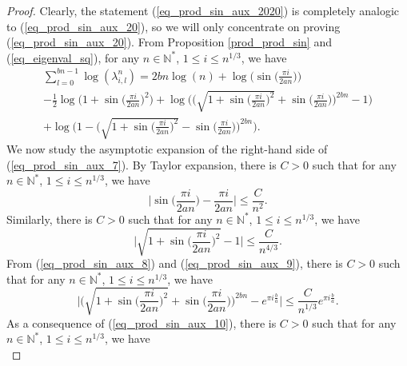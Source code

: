 \documentclass[12pt]{article}
\numberwithin{equation}{section}
\theoremstyle{theorem}
\theoremstyle{definition}
\theoremstyle{remark}
\newcommand{\nat}{\mathbb{N}}
\begin{document}
		\begin{proof}
			Clearly, the statement (\ref{eq_prod_sin_aux_2020}) is completely analogic to (\ref{eq_prod_sin_aux_20}), so we will only concentrate on proving (\ref{eq_prod_sin_aux_20}).
			From Proposition \ref{prod_prod_sin} and (\ref{eq_eigenval_sq}), for any $n \in \nat^*$, $1 \leq i \leq  n^{1/3}$,  we have
			\begin{multline}\label{eq_prod_sin_aux_7}
				\sum_{l = 0}^{bn - 1} 
				\log(\lambda_{i, l}^{n})
				=
				2 bn \log(n) 
				+
				\log \Big( \sin  \big( \frac{\pi i}{2 a n} \big) \Big) 
				\\
				- 
				\frac{1}{2} 
				\log \Big(
					1 + \sin  \big( \frac{\pi i}{2 a n} \big)^2
				\Big)
				+
				\log 
				\Big(
					\Big( \sqrt{ 1 + \sin  \big( \frac{\pi i}{2 a n} \big)^2} + \sin  \big( \frac{\pi i}{2 a n} \big)  \Big)^{2bn} - 1
				\Big)
				\\
				+
				\log 
				\Big(
					1 - \Big(  \sqrt{ 1 + \sin  \big( \frac{\pi i}{2 a n} \big)^2} - \sin  \big( \frac{\pi i}{2 a n} \big) \Big)^{2bn}
				\Big).
			\end{multline}
			We now study the asymptotic expansion of the right-hand side of (\ref{eq_prod_sin_aux_7}).
			By Taylor expansion, there is $C > 0$ such that for any $n \in \nat^*$, $1 \leq i \leq n^{1/3}$, we have
			\begin{equation}\label{eq_prod_sin_aux_8}
				\Big| \sin  \big( \frac{\pi i}{2 a n} \big) - \frac{\pi i}{2 a n} \Big| \leq \frac{C}{n^{2}}.
			\end{equation}
			Similarly, there is $C > 0$ such that for any $n \in \nat^*$, $1 \leq i \leq  n^{1/3}$, we have
			\begin{equation}\label{eq_prod_sin_aux_9}
				\Big| \sqrt{ 1 + \sin  \big( \frac{\pi i}{2 a n} \big)^2} - 1 \Big| \leq \frac{C}{n^{4/3}}.
			\end{equation}
			From (\ref{eq_prod_sin_aux_8}) and (\ref{eq_prod_sin_aux_9}), there is $C > 0$ such that for any $n \in \nat^*$, $1 \leq i \leq  n^{1/3}$, we have
			\begin{equation}\label{eq_prod_sin_aux_10}
				\bigg|
				\Big( \sqrt{ 1 + \sin  \big( \frac{\pi i}{2 a n} \big)^2} + \sin  \big( \frac{\pi i}{2 a n} \big) \Big)^{2bn}
				-
				e^{\pi i \frac{b}{a}}
				\bigg|
				\leq
				\frac{C}{n^{1/3}}e^{\pi i \frac{b}{a}}.
			\end{equation}
			As a consequence of (\ref{eq_prod_sin_aux_10}), there is $C > 0$ such that for any $n \in \nat^*$, $1 \leq i \leq  n^{1/3}$, we have
			\begin{equation}\label{eq_prod_sin_aux_11}

\end{equation}
\end{proof}
\end{document}
